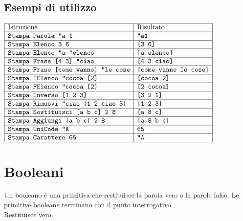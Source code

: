 \subsection{Esempi di utilizzo}
$\begin{array}{|l|l|}
	\hline \textrm{Istruzione} & \textrm{Risultato} \\ \hline
	\texttt{Stampa Parola \textquotedbl a 1} 										& \texttt{\textquotedbl a1}\\
	\hline
	\texttt{Stampa Elenco 3 6} 										& \texttt{[3 6]}\\
	\hline
	\texttt{Stampa Elenco \textquotedbl a \textquotedbl elenco} 		& \texttt{[a elenco]} \\
	\hline
	\texttt{Stampa Frase\ {[}4 3{]} \textquotedbl ciao} 				& \texttt{[4 3 ciao]}\\
	\hline
	\texttt{Stampa Frase\ {[}come vanno{]} \textquotedbl le cose} 		& \texttt{[come vanno le cose]} \\
	\hline
	\texttt{Stampa IElenco \textquotedbl cocoa [2]} 				& \texttt{[cocoa 2]}\\
	\hline
	\texttt{Stampa FElenco \textquotedbl cocoa [2]} 				& \texttt{[2 cocoa]}\\
	\hline
	\texttt{Stampa Inverso [1 2 3]} 				& \texttt{[3 2 1]}\\
	\hline
	\texttt{Stampa Rimuovi \textquotedbl ciao [1 2 ciao 3]} 				& \texttt{[1 2 3]}\\
	\hline
	\texttt{Stampa Sostituisci [a b c] 2 8} 				& \texttt{[a 8 c]}\\
	\hline
	\texttt{Stampa Aggiungi [a b c] 2 8} 				& \texttt{[a 8 b c]}\\
	\hline
	\texttt{Stampa UniCode \textquotedbl A} 				& \texttt{65}\\
	\hline
	\texttt{Stampa Carattere 65} 				& \texttt{\textquotedbl A}\\
	\hline
\end{array}$



\section{Booleani}

Un booleano è una primitiva che restituisce la parola \textquotedbl vero o la parole \textquotedbl falso. Le primitive booleane terminano con il punto interrogativo.\\

 Restituisce \textquotedbl vero.\\

